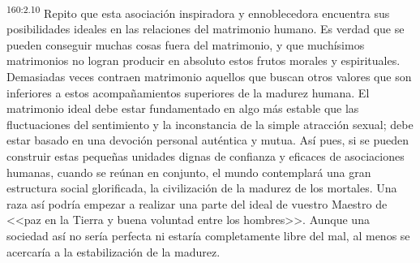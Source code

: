 \par 
\textsuperscript{160:2.10} Repito que esta asociación inspiradora y ennoblecedora encuentra sus posibilidades ideales en las relaciones del matrimonio humano. Es verdad que se pueden conseguir muchas cosas fuera del matrimonio, y que muchísimos matrimonios no logran producir en absoluto estos frutos morales y espirituales. Demasiadas veces contraen matrimonio aquellos que buscan otros valores que son inferiores a estos acompañamientos superiores de la madurez humana. El matrimonio ideal debe estar fundamentado en algo más estable que las fluctuaciones del sentimiento y la inconstancia de la simple atracción sexual; debe estar basado en una devoción personal auténtica y mutua. Así pues, si se pueden construir estas pequeñas unidades dignas de confianza y eficaces de asociaciones humanas, cuando se reúnan en conjunto, el mundo contemplará una gran estructura social glorificada, la civilización de la madurez de los mortales. Una raza así podría empezar a realizar una parte del ideal de vuestro Maestro de <<paz en la Tierra y buena voluntad entre los hombres>>. Aunque una sociedad así no sería perfecta ni estaría completamente libre del mal, al menos se acercaría a la estabilización de la madurez.


